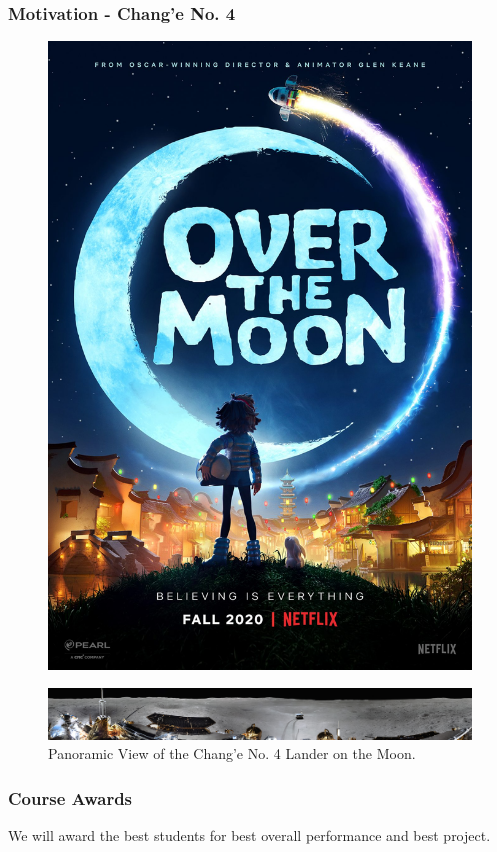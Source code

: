 \documentclass[10pt, compress]{beamer}
\begin{document}
\begin{frame}
  \frametitle{Motivation - Chang'e No. 4}
    \begin{figure}
  \centering
  \includegraphics[width=.35\linewidth]{overthemoon.jpeg}
\end{figure}
  \begin{figure}
  \centering
  \includegraphics[width=.85\linewidth]{change.jpg}
  \caption*{Panoramic View of the Chang'e No. 4 Lander on the Moon.}
\end{figure}
\end{frame}

\begin{frame}
  \frametitle{Course Awards}
  \begin{outline}
    \1 We will award the best students for best overall performance and best project. 
  \end{outline}
  \begin{figure}
   \hfil
  \end{figure}
\end{frame}
\end{document}

